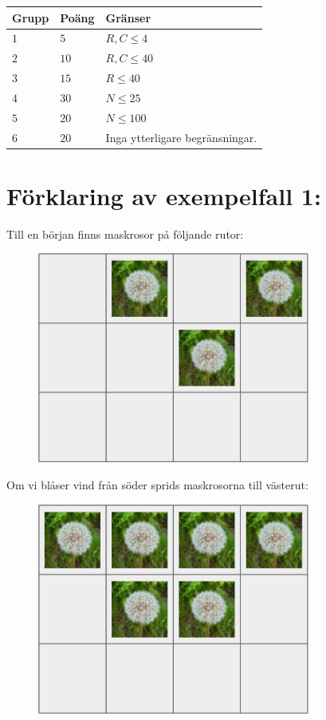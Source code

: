\noindent
\begin{tabular}{| l | l | p{12cm} |}
  \hline
  \textbf{Grupp} & \textbf{Poäng} & \textbf{Gränser} \\ \hline
  $1$    & $5$          & $R,C \leq 4$  \\ \hline
  $2$    & $10$         & $R,C \leq 40$ \\ \hline
  $3$    & $15$         & $R \leq 40$ \\ \hline
  $4$    & $30$         & $N \leq 25$ \\ \hline
  $5$    & $20$         & $N \leq 100$ \\ \hline
  $6$    & $20$         & Inga ytterligare begränsningar. \\ \hline
\end{tabular}

\section*{Förklaring av exempelfall 1:}
Till en början finns maskrosor på följande rutor:
\begin{centering}
  \begin{figure}[h]
      \centering
      \includegraphics[width=0.8\textwidth]{t0.png}
  \end{figure}
\end{centering}
Om vi blåser vind från söder sprids maskrosorna till västerut:
\begin{centering}
  \begin{figure}[h]
      \centering
      \includegraphics[width=0.8\textwidth]{t1.png}
  \end{figure}
\end{centering}
